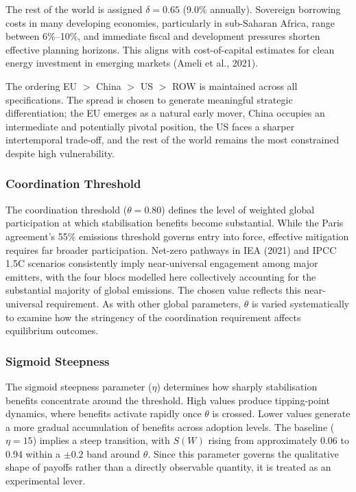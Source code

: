 \documentclass[12pt,a4paper]{article}
\begin{document}
The rest of the world is assigned $\delta = 0.65$ (9.0\% annually). Sovereign borrowing costs in many developing economies, particularly in sub-Saharan Africa, range between 6\%--10\%, and immediate fiscal and development pressures shorten effective planning horizons. This aligns with cost-of-capital estimates for clean energy investment in emerging markets (Ameli et al., 2021).

The ordering EU $>$ China $>$ US $>$ ROW is maintained across all specifications. The spread is chosen to generate meaningful strategic differentiation; the EU emerges as a natural early mover, China occupies an intermediate and potentially pivotal position, the US faces a sharper intertemporal trade-off, and the rest of the world remains the most constrained despite high vulnerability.

\subsubsection{Coordination Threshold}

The coordination threshold ($\theta = 0.80$) defines the level of weighted global participation at which stabilisation benefits become substantial. While the Paris agreement's 55\% emissions threshold governs entry into force, effective mitigation requires far broader participation. Net-zero pathways in IEA (2021) and IPCC 1.5\textdegree C scenarios consistently imply near-universal engagement among major emitters, with the four blocs modelled here collectively accounting for the substantial majority of global emissions. The chosen value reflects this near-universal requirement. As with other global parameters, $\theta$ is varied systematically to examine how the stringency of the coordination requirement affects equilibrium outcomes.

\subsubsection{Sigmoid Steepness}

The sigmoid steepness parameter ($\eta$) determines how sharply stabilisation benefits concentrate around the threshold. High values produce tipping-point dynamics, where benefits activate rapidly once $\theta$ is crossed. Lower values generate a more gradual accumulation of benefits across adoption levels. The baseline ($\eta = 15$) implies a steep transition, with $S(W)$ rising from approximately 0.06 to 0.94 within a $\pm 0.2$ band around $\theta$. Since this parameter governs the qualitative shape of payoffs rather than a directly observable quantity, it is treated as an experimental lever.
\end{document}
